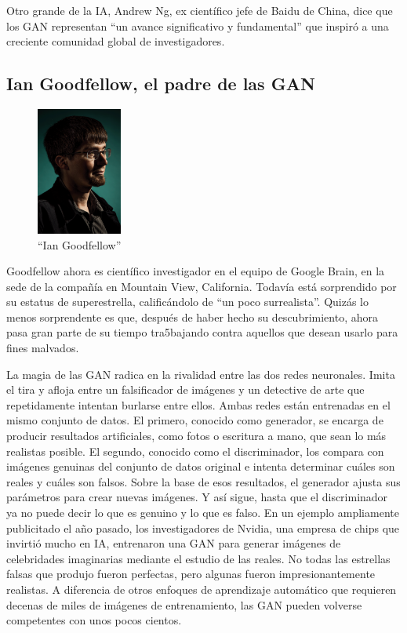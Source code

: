\documentclass[a4paper]{article}
\begin{document}
Otro grande de la IA, Andrew Ng, ex científico jefe de Baidu de 
China, dice que los GAN representan ``un
avance significativo y fundamental'' que inspiró a una creciente 
comunidad global de investigadores.

\subsection{Ian Goodfellow, el padre de las GAN}

\begin{figure} %
    \centering
    \includegraphics[width=0.25\textwidth]{./images/ma18-iangoodfellow2a.png}
    \caption{``Ian Goodfellow''}
\end{figure}


Goodfellow ahora es científico investigador en el equipo de Google 
Brain, en la sede de la compañía en Mountain View,
California. Todavía está sorprendido por su estatus de 
superestrella, calificándolo de ``un poco surrealista''. Quizás lo 
menos sorprendente es que, después de haber hecho su 
descubrimiento, ahora pasa gran parte de su tiempo tra5bajando 
contra aquellos que desean usarlo para fines malvados.

La magia de las GAN radica en la rivalidad entre las dos redes 
neuronales. Imita el tira y afloja entre un falsificador de 
imágenes y un detective de arte que repetidamente intentan 
burlarse entre ellos. Ambas redes están entrenadas en el mismo 
conjunto de datos. El primero, conocido como generador, se encarga 
de producir resultados artificiales, como fotos o escritura a 
mano, que sean lo más realistas posible. El segundo, conocido como 
el discriminador, los compara con imágenes genuinas del conjunto 
de datos original e intenta determinar cuáles son reales y cuáles 
son falsos. Sobre la base de esos resultados, el generador ajusta 
sus parámetros para crear nuevas imágenes. Y así sigue, hasta que 
el discriminador ya no puede decir lo que es genuino y lo que es 
falso.
En un ejemplo ampliamente publicitado el año pasado, los 
investigadores de Nvidia, una empresa de chips que invirtió mucho 
en IA, entrenaron una GAN para generar imágenes de celebridades 
imaginarias mediante el estudio de las reales. No todas las 
estrellas falsas que produjo fueron perfectas, pero algunas fueron 
impresionantemente realistas. A diferencia de otros enfoques de 
aprendizaje automático que requieren decenas de miles de imágenes 
de entrenamiento, las GAN pueden volverse competentes con unos 
pocos cientos.
\end{document}
